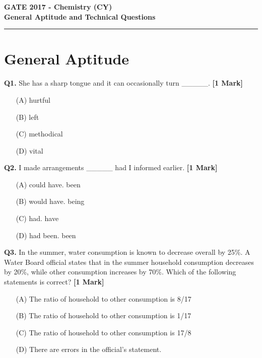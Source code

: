 \documentclass[11pt]{article}
\newcommand{\questiona}[2]{
    \noindent\textbf{Q#2.} #1 \hfill \textbf{[1 Mark]}
}
\begin{document}
\begin{center}
    \Large\textbf{GATE 2017 - Chemistry (CY)} \\
    \large\textbf{General Aptitude and Technical Questions} \\
    \rule{\textwidth}{0.5pt} %
\end{center}

\vspace{0.5cm}

\section*{General Aptitude}

\questiona{She has a sharp tongue and it can occasionally turn \_\_\_\_\_.}{1}
\begin{enumerate}
    \item[(A)] hurtful  
    \item[(B)] left  
    \item[(C)] methodical  
    \item[(D)] vital  
\end{enumerate}
\vspace{0.5cm}

\questiona{I made arrangements \_\_\_\_\_ had I informed earlier.}{2}
\begin{enumerate}
    \item[(A)] could have. been  
    \item[(B)] would have. being  
    \item[(C)] had. have  
    \item[(D)] had been. been  
\end{enumerate}
\vspace{0.5cm}

\questiona{In the summer, water consumption is known to decrease overall by 25\%. A Water Board official states that in the summer household consumption decreases by 20\%, while other consumption increases by 70\%. Which of the following statements is correct?}{3}
\begin{enumerate}
    \item[(A)] The ratio of household to other consumption is 8/17  
    \item[(B)] The ratio of household to other consumption is 1/17  
    \item[(C)] The ratio of household to other consumption is 17/8  
    \item[(D)] There are errors in the official’s statement.  
\end{enumerate}
\vspace{0.5cm}
\end{document}
